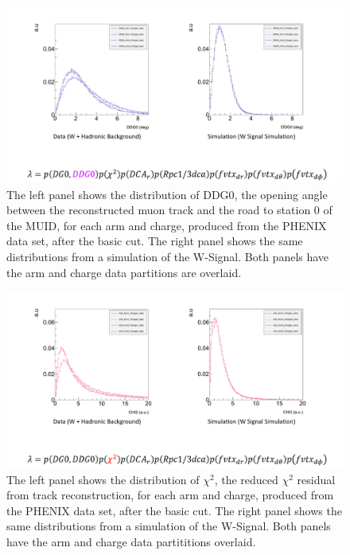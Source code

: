 \begin{figure}
  \centering
  \includegraphics[width=\linewidth,trim=4 70 4 4,clip]{./figures/pdf_DDG0.png}
  \caption{
		The left panel shows the distribution of DDG0, the opening angle between the
		reconstructed muon track and the road to station 0 of the MUID, for each arm
		and charge, produced from the PHENIX data set, after the basic cut. The
		right panel shows the same distributions from a simulation of the W-Signal.
		Both panels have the arm and charge data partitions are overlaid.
  }
  \label{fig:pdf_DDG0}
\end{figure}

\begin{figure}
  \centering
  \includegraphics[width=\linewidth,trim=4 70 4 4,clip]{./figures/pdf_chi2.png}
  \caption{
		The left panel shows the distribution of $\chi^2$, the reduced $\chi^2$
		residual from track reconstruction, for each arm and charge,
		produced from the PHENIX data set, after the basic cut. The right panel
		shows the same distributions from a simulation of the W-Signal. Both panels
		have the arm and charge data partititions overlaid.
  }
  \label{fig:pdf_chi2}
\end{figure}


